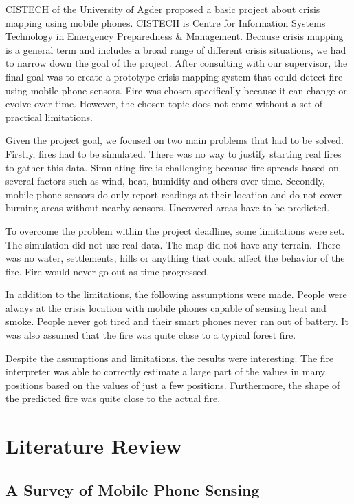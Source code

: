 CISTECH of the University of Agder proposed a basic project about crisis mapping using mobile phones. CISTECH is Centre for Information Systems Technology in Emergency Preparedness \& Management. Because crisis mapping is a general term and includes a broad range of different crisis situations, we had to narrow down the goal of the project. After consulting with our supervisor, the final goal was to create a prototype crisis mapping system that could detect fire using mobile phone sensors. Fire was chosen specifically because it can change or evolve over time. However, the chosen topic does not come without a set of practical limitations.

Given the project goal, we focused on two main problems that had to be solved. Firstly, fires had to be simulated. There was no way to justify starting real fires to gather this data. Simulating fire is challenging because fire spreads based on several factors such as wind, heat, humidity and others over time. Secondly, mobile phone sensors do only report readings at their location and do not cover burning areas without nearby sensors. Uncovered areas have to be predicted.

To overcome the problem within the project deadline, some limitations were set. The simulation did not use real data. The map did not have any terrain. There was no water, settlements, hills or anything that could affect the behavior of the fire. Fire would never go out as time progressed.

In addition to the limitations, the following assumptions were made. People were always at the crisis location with mobile phones capable of sensing heat and smoke. People never got tired and their smart phones never ran out of battery. It was also assumed that the fire was quite close to a typical forest fire.

Despite the assumptions and limitations, the results were interesting. The fire interpreter was able to correctly estimate a large part of the values in many positions based on the values of just a few positions. Furthermore, the shape of the predicted fire was quite close to the actual fire.

\section{Literature Review}

\subsection{A Survey of Mobile Phone Sensing}

